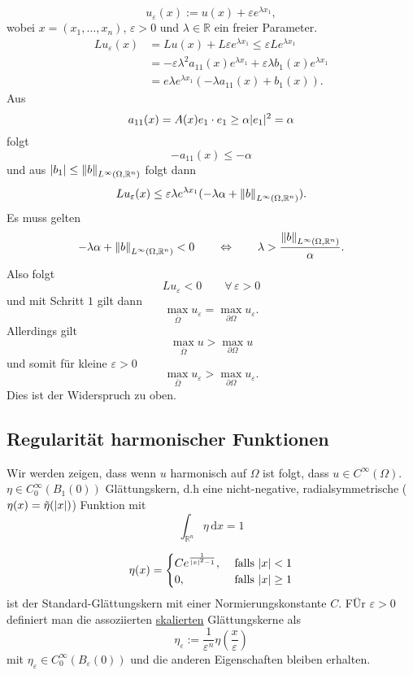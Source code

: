 \begin{beweis}
\begin{description}
		\[
			u_{\varepsilon}(x):= u(x) + \varepsilon e^{\lambda x_1},
		\]
		wobei $x = (x_1, \dots, x_n)$, $\varepsilon > 0$ und $\lambda \in \mathbb{R}$ ein freier Parameter.
		\begin{align*}
			Lu_{\varepsilon}(x) &= Lu(x) + L \varepsilon e^{\lambda x_1} \leq \varepsilon L e^{\lambda x_1} \\ 
			&= - \varepsilon \lambda^2 a_{11}(x) e^{\lambda x_1} + \varepsilon \lambda b_1(x) e^{\lambda x_1} \\
			&= e \lambda e^{\lambda x_1} ( - \lambda a_{11}(x)+ b_1(x)).
		\end{align*}
		Aus \begin{equation}
			a_{11}(x)= A(x)e_1 \cdot e_1 \geq \alpha \lvert e_1\rvert^2 = \alpha
		\end{equation}
		folgt
		\[
			-a_{11}(x) \leq -\alpha
		\]
		und aus $\abs{b_1} \leq \norm{b}_{L^{\infty}(\Omega,\mathbb{R}^n)}$ folgt dann
		\[
			Lu_{\varepsilon}(x) \leq  \varepsilon \lambda e^{\lambda x_1}(-\lambda \alpha + \norm{b}_{L^{\infty}(\Omega,\mathbb{R}^n)}).
		\]
		Es muss gelten 
		\[
			-\lambda \alpha + \norm{b}_{L^{\infty}(\Omega,\mathbb{R}^n)}<0 \qquad \Leftrightarrow \qquad \lambda > \frac{\norm{b}_{L^{\infty}(\Omega,\mathbb{R}^n)}}{\alpha}.
		\]
		Also folgt 
		\[
			Lu_{\varepsilon} < 0 \qquad \forall\, \varepsilon >0 
		\]
		und mit Schritt $1$ gilt dann
		\[
			\max_{\bar{\Omega}}u_{\varepsilon} = \max_{ \partial \Omega}u_{\varepsilon}.
		\]
		Allerdings gilt \[
			\max_{\bar{\Omega}}u > \max_{ \partial \Omega}u
		\]
		und somit für kleine $\varepsilon >0$ \[
			\max_{\bar{\Omega}}u_{\varepsilon} > \max_{ \partial \Omega}u_{\varepsilon}.
		\]
		Dies ist der Widerspruch zu oben.
 	\end{description}
\end{beweis}
\subsection{Regularität harmonischer Funktionen} 
\label{sub:regularitat_harmonischer_funktionen}
Wir werden zeigen, dass wenn $u$ harmonisch auf $\Omega$ ist folgt, dass $u \in C^{\infty}(\Omega)$.
$\eta \in C^{\infty}_0(B_1(0))$ Glättungskern, d.h eine nicht-negative, radialsymmetrische ($\eta(x)=\tilde\eta(\lvert x\rvert)$) Funktion mit
\[
	\int_{\mathbb{R}^n}^{}\eta \,\mathrm{d}x = 1
\]	
\begin{beispiel}
	\begin{equation}
		\eta(x) = \begin{cases}
			C e^{\frac{1}{\lvert x\rvert^2-1}}, &\text{ falls }\lvert x\rvert<1\\
			0 , &\text{ falls }\lvert x\rvert\geq 1\\
		\end{cases}
	\end{equation}
	ist der Standard-Glättungskern mit einer Normierungskonstante $C$. FÜr $\varepsilon > 0$ definiert man die assoziierten \underline{skalierten} Glättungskerne als
	\[
		\eta_{\varepsilon}:= \frac{1}{\varepsilon^n}\eta \left( \frac{x}{\varepsilon} \right)
	\]
	mit $\eta_{\varepsilon} \in C_0^{\infty}(B_{\varepsilon}(0))$ und die anderen Eigenschaften bleiben erhalten.
\end{beispiel}

